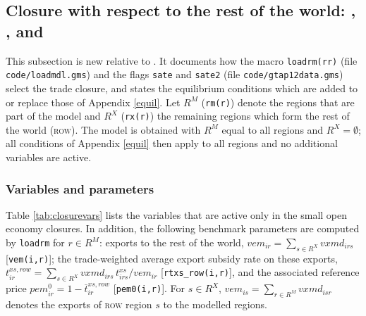 \subsection[Closures]{Closure with respect to the rest of the world: \GMR, \SOE, and \SATE}\label{app:closures}

This subsection is new relative to \citet{LanzRutherford2016}.
It documents how the macro \texttt{loadrm(rr)} (file \texttt{code/loadmdl.gms}) and the flags \texttt{sate} and \texttt{sate2} (file \texttt{code/gtap12data.gms}) select the trade closure, and states the equilibrium conditions which are added to or replace those of Appendix \ref{equil}.
Let $R^M$ (\texttt{rm(r)}) denote the regions that are part of the model and $R^X$ (\texttt{rx(r)}) the remaining regions which form the rest of the world (\textsc{row}).
The \GMR model is obtained with $R^M$ equal to all regions and $R^X=\emptyset$; all conditions of Appendix \ref{equil} then apply to all regions and no additional variables are active.

\subsubsection{Variables and parameters}

Table \ref{tab:closurevars} lists the variables that are active only in the small open economy closures.
In addition, the following benchmark parameters are computed by \texttt{loadrm} for $r\in R^M$: exports to the rest of the world, $\textit{vem}_{ir}=\sum_{s\in R^X}\textit{vxmd}_{irs}$ [\texttt{vem(i,r)}]; the trade-weighted average export subsidy rate on these exports, $t^{xs,row}_{ir}=\sum_{s\in R^X}\textit{vxmd}_{irs}\,t^{xs}_{irs}/\textit{vem}_{ir}$ [\texttt{rtxs\_row(i,r)}], and the associated reference price $\textit{pem}^0_{ir}=1-\overline{t}^{xs,row}_{ir}$ [\texttt{pem0(i,r)}].
For $s\in R^X$, $\textit{vem}_{is}=\sum_{r\in R^M}\textit{vxmd}_{isr}$ denotes the exports of \textsc{row} region $s$ to the modelled regions.

